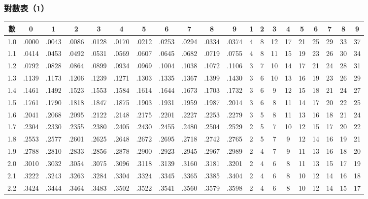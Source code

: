\subsubsection*{對數表（1）}
{\centering\fontsize{7.5pt}{8.8pt}\selectfont\setlength{\tabcolsep}{1.5pt}\renewcommand{\arraystretch}{0.96}
\begin{tabular}{|c|cccccccccc|ccccccccc|}
\hline
數 & 0 & 1 & 2 & 3 & 4 & 5 & 6 & 7 & 8 & 9 & 1 & 2 & 3 & 4 & 5 & 6 & 7 & 8 & 9 \\ \hline
1.0 & .0000 & .0043 & .0086 & .0128 & .0170 & .0212 & .0253 & .0294 & .0334 & .0374 & 4 & 8 & 12 & 17 & 21 & 25 & 29 & 33 & 37 \\
1.1 & .0414 & .0453 & .0492 & .0531 & .0569 & .0607 & .0645 & .0682 & .0719 & .0755 & 4 & 8 & 11 & 15 & 19 & 23 & 26 & 30 & 34 \\
1.2 & .0792 & .0828 & .0864 & .0899 & .0934 & .0969 & .1004 & .1038 & .1072 & .1106 & 3 & 7 & 10 & 14 & 17 & 21 & 24 & 28 & 31 \\
1.3 & .1139 & .1173 & .1206 & .1239 & .1271 & .1303 & .1335 & .1367 & .1399 & .1430 & 3 & 6 & 10 & 13 & 16 & 19 & 23 & 26 & 29 \\
1.4 & .1461 & .1492 & .1523 & .1553 & .1584 & .1614 & .1644 & .1673 & .1703 & .1732 & 3 & 6 & 9 & 12 & 15 & 18 & 21 & 24 & 27 \\
1.5 & .1761 & .1790 & .1818 & .1847 & .1875 & .1903 & .1931 & .1959 & .1987 & .2014 & 3 & 6 & 8 & 11 & 14 & 17 & 20 & 22 & 25 \\
1.6 & .2041 & .2068 & .2095 & .2122 & .2148 & .2175 & .2201 & .2227 & .2253 & .2279 & 3 & 5 & 8 & 11 & 13 & 16 & 18 & 21 & 24 \\
1.7 & .2304 & .2330 & .2355 & .2380 & .2405 & .2430 & .2455 & .2480 & .2504 & .2529 & 2 & 5 & 7 & 10 & 12 & 15 & 17 & 20 & 22 \\
1.8 & .2553 & .2577 & .2601 & .2625 & .2648 & .2672 & .2695 & .2718 & .2742 & .2765 & 2 & 5 & 7 & 9 & 12 & 14 & 16 & 19 & 21 \\
1.9 & .2788 & .2810 & .2833 & .2856 & .2878 & .2900 & .2923 & .2945 & .2967 & .2989 & 2 & 4 & 7 & 9 & 11 & 13 & 16 & 18 & 20 \\
2.0 & .3010 & .3032 & .3054 & .3075 & .3096 & .3118 & .3139 & .3160 & .3181 & .3201 & 2 & 4 & 6 & 8 & 11 & 13 & 15 & 17 & 19 \\
2.1 & .3222 & .3243 & .3263 & .3284 & .3304 & .3324 & .3345 & .3365 & .3385 & .3404 & 2 & 4 & 6 & 8 & 10 & 12 & 14 & 16 & 18 \\
2.2 & .3424 & .3444 & .3464 & .3483 & .3502 & .3522 & .3541 & .3560 & .3579 & .3598 & 2 & 4 & 6 & 8 & 10 & 12 & 14 & 15 & 17 \\

\end{tabular}}
